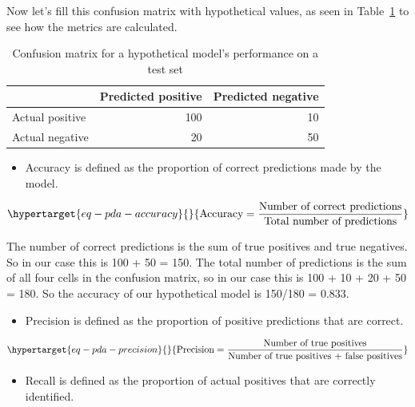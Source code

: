 \documentclass[
  letterpaper,
]{scrbook}
\providecommand{\tightlist}{%
  \setlength{\itemsep}{0pt}\setlength{\parskip}{0pt}}\usepackage{longtable,booktabs,array}
\begin{document}
Now let's fill this confusion matrix with hypothetical values, as seen
in Table~\ref{tbl-pda-confusion-matrix-example} to see how the metrics
are calculated.

\hypertarget{tbl-pda-confusion-matrix-example}{}
\begin{table}
\caption{\label{tbl-pda-confusion-matrix-example}Confusion matrix for a hypothetical model's performance on a test set }\tabularnewline

\centering
\begin{tabular}{l|r|r}
\hline
  & Predicted positive & Predicted negative\\
\hline
Actual positive & 100 & 10\\
\hline
Actual negative & 20 & 50\\
\hline
\end{tabular}
\end{table}

\begin{itemize}
\tightlist
\item
  Accuracy is defined as the proportion of correct predictions made by
  the model.
\end{itemize}

\begin{equation}\protect\hypertarget{eq-pda-accuracy}{}{
\text{Accuracy} = \frac{\text{Number of correct predictions}}{\text{Total number of predictions}}
}\label{eq-pda-accuracy}\end{equation}

The number of correct predictions is the sum of true positives and true
negatives. So in our case this is 100 + 50 = 150. The total number of
predictions is the sum of all four cells in the confusion matrix, so in
our case this is 100 + 10 + 20 + 50 = 180. So the accuracy of our
hypothetical model is 150/180 = 0.833.

\begin{itemize}
\tightlist
\item
  Precision is defined as the proportion of positive predictions that
  are correct.
\end{itemize}

\begin{equation}\protect\hypertarget{eq-pda-precision}{}{
\text{Precision} = \frac{\text{Number of true positives}}{\text{Number of true positives + false positives}}
}\label{eq-pda-precision}\end{equation}

\begin{itemize}
\tightlist
\item
  Recall is defined as the proportion of actual positives that are
  correctly identified.
\end{itemize}
\end{document}
